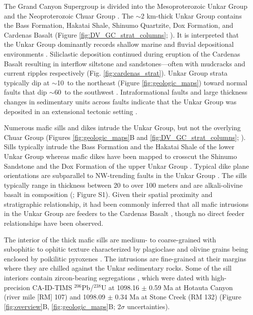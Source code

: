 The Grand Canyon Supergroup is divided into the Mesoproterozoic Unkar Group and the Neoproterozoic Chuar Group \cite{Gundy1951a, Elston1989a, Dehler2017a}. The $\sim$2 km-thick Unkar Group contains the Bass Formation, Hakatai Shale, Shinumo Quartzite, Dox Formation, and Cardenas Basalt (Figure \ref{fig:DV_GC_strat_columns}; ). It is interpreted that the Unkar Group dominantly records shallow marine and fluvial depositional environments \cite{Elston1989a, Sears1990a, Hendricks1989a, Timmons2005a}. Siliclastic deposition continued during eruption of the Cardenas Basalt resulting in interflow siltstone and sandstones---often with mudcracks and current ripples respectively  (Fig. \ref{fig:cardenas_strat}). Unkar Group strata typically dip at $\sim$10\textdegree\ to the northeast (Figure \ref{fig:geologic_maps}) toward normal faults that dip $\sim$60\textdegree\ to the southwest \cite{Sears1973a, Timmons2012a}. Intraformational faults and large thickness changes in sedimentary units across faults indicate that the Unkar Group was deposited in an extensional tectonic setting \cite{Sears1990a, Karlstrom1998a, Timmons2001a}. 

Numerous mafic sills and dikes intrude the Unkar Group, but not the overlying Chuar Group (Figures \ref{fig:geologic_maps}B and \ref{fig:DV_GC_strat_columns}; ). Sills typically intrude the Bass Formation and the Hakatai Shale of the lower Unkar Group \cite{Hendricks1989a} whereas mafic dikes have been mapped to crosscut the Shinumo Sandstone and the Dox Formation of the upper Unkar Group \cite{Timmons2012a}. Typical dike plane orientations are subparallel to NW-trending faults in the Unkar Group \cite{Huntoon1996a, Timmons2012a}. The sills typically range in thickness between 20 to over 100 meters and are alkali-olivine basalt in composition (; Figure S1). Given their spatial proximity and stratigraphic relationship, it had been commonly inferred that all mafic intrusions in the Unkar Group are feeders to the Cardenas Basalt \cite[e.g.][]{Huntoon1996a, Timmons2012a}, though no direct feeder relationships have been observed.

The interior of the thick mafic sills are medium- to coarse-grained with subophitic to ophitic texture characterized by plagioclase and olivine grains being enclosed by poikilitic pyroxenes \cite{Hendricks1989a}. The intrusions are fine-grained at their margins where they are chilled against the Unkar sedimentary rocks.  Some of the sill interiors contain zircon-bearing segregations \cite{Mohr2024a}, which were dated with high-precision CA-ID-TIMS $^{206}$Pb/$^{238}$U at 1098.16 $\pm$ 0.59 Ma at Hotauta Canyon (river mile [RM] 107) and 1098.09 $\pm$ 0.34 Ma at Stone Creek (RM 132) (Figure \ref{fig:overview}B, \ref{fig:geologic_maps}B; 2$\sigma$ uncertainties). 

